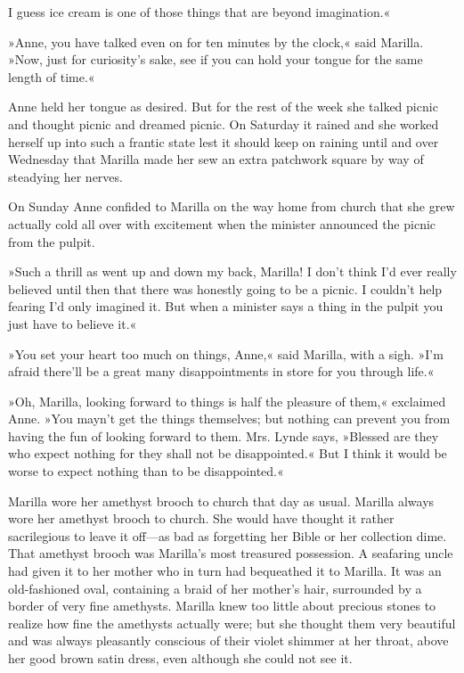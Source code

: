 I guess ice cream is one of those things that are beyond imagination.«

»Anne, you have talked even on for ten minutes by the clock,« said Marilla. »Now, just for curiosity’s sake, see if you can hold your tongue for the same length of time.«

Anne held her tongue as desired. But for the rest of the week she talked picnic and thought picnic and dreamed picnic. On Saturday it rained and she worked herself up into such a frantic state lest it should keep on raining until and over Wednesday that Marilla made her sew an extra patchwork square by way of steadying her nerves.

On Sunday Anne confided to Marilla on the way home from church that she grew actually cold all over with excitement when the minister announced the picnic from the pulpit.

»Such a thrill as went up and down my back, Marilla! I don’t think I’d ever really believed until then that there was honestly going to be a picnic. I couldn’t help fearing I’d only imagined it. But when a minister says a thing in the pulpit you just have to believe it.«

»You set your heart too much on things, Anne,« said Marilla, with a sigh. »I’m afraid there’ll be a great many disappointments in store for you through life.«

»Oh, Marilla, looking forward to things is half the pleasure of them,« exclaimed Anne. »You mayn’t get the things themselves; but nothing can prevent you from having the fun of looking forward to them. Mrs. Lynde says, »Blessed are they who expect nothing for they shall not be disappointed.« But I think it would be worse to expect nothing than to be disappointed.«

Marilla wore her amethyst brooch to church that day as usual. Marilla always wore her amethyst brooch to church. She would have thought it rather sacrilegious to leave it off—as bad as forgetting her Bible or her collection dime. That amethyst brooch was Marilla’s most treasured possession. A seafaring uncle had given it to her mother who in turn had bequeathed it to Marilla. It was an old-fashioned oval, containing a braid of her mother’s hair, surrounded by a border of very fine amethysts. Marilla knew too little about precious stones to realize how fine the amethysts actually were; but she thought them very beautiful and was always pleasantly conscious of their violet shimmer at her throat, above her good brown satin dress, even although she could not see it.

